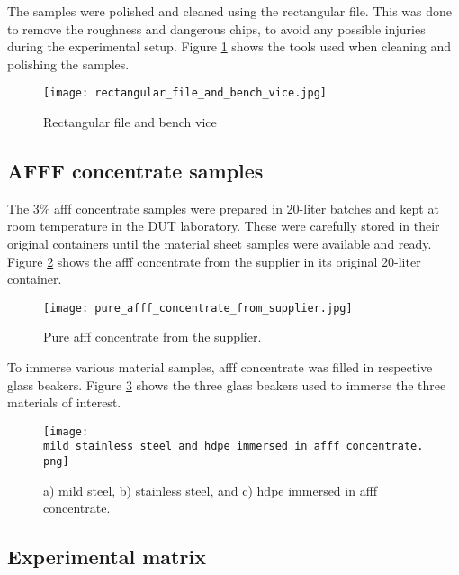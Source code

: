 The samples were polished and cleaned using the rectangular file. This was done to remove the roughness and dangerous chips, to avoid any possible injuries during the experimental setup. Figure \ref{ch4:figure:file_and_vice} shows the tools used when cleaning and polishing the samples.
 
\begin{figure}[H]
    \centering
    \texttt{[image: rectangular\_file\_and\_bench\_vice.jpg]}
    \caption{Rectangular file and bench vice}
    \label{ch4:figure:file_and_vice}
\end{figure}

\subsection{AFFF concentrate samples}
The 3\% \acrshort{afff} concentrate samples were prepared in 20-liter batches and kept at room temperature in the DUT laboratory. These were carefully stored in their original containers until the material sheet samples were available and ready. Figure \ref{ch4:figure:suplier} shows the \acrshort{afff} concentrate from the supplier in its original 20-liter container.
 
\begin{figure}[H]
    \centering
    \texttt{[image: pure\_afff\_concentrate\_from\_supplier.jpg]}
    \caption{Pure \acrshort{afff} concentrate from the supplier.}
    \label{ch4:figure:suplier}
\end{figure}

To immerse various material samples, \acrshort{afff} concentrate was filled in respective glass beakers. Figure \ref{ch4:figure:immersed} shows the three glass beakers used to immerse the three materials of interest.
 
\begin{figure}[H]
\texttt{[image: mild\_stainless\_steel\_and\_hdpe\_immersed\_in\_afff\_concentrate.png]}
\caption{a) mild steel, b) stainless steel, and c) \acrshort{hdpe} immersed in \acrshort{afff} concentrate.}
\label{ch4:figure:immersed}
\end{figure}

\subsection{Experimental matrix}

